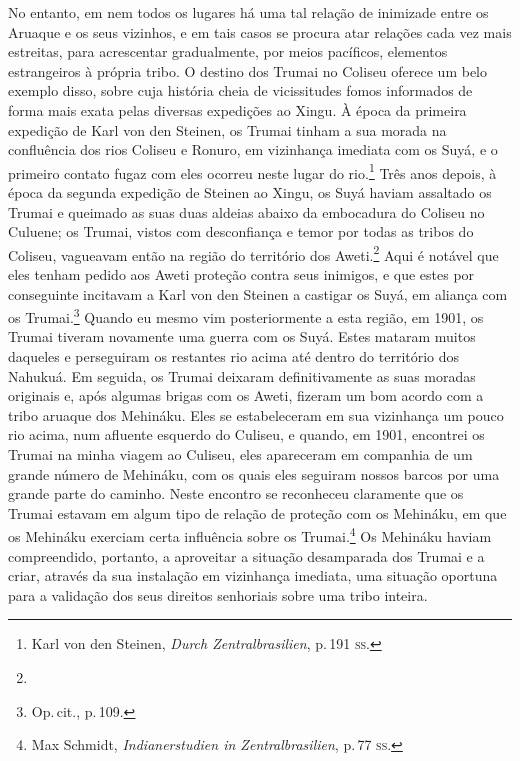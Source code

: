 No entanto, em nem todos os lugares há uma tal relação de inimizade
entre os Aruaque e os seus vizinhos, e em tais casos se procura atar
relações cada vez mais estreitas, para acrescentar gradualmente, por
meios pacíficos, elementos estrangeiros à própria tribo. O destino dos
Trumai no Coliseu oferece um belo exemplo disso, sobre cuja história
cheia de vicissitudes fomos informados de forma mais exata pelas
diversas expedições ao Xingu. À época da primeira expedição de Karl von
den Steinen, os Trumai tinham a sua morada na confluência dos rios
Coliseu e Ronuro, em vizinhança imediata com os Suyá, e o primeiro
contato fugaz com eles ocorreu neste lugar do rio.\footnote{Karl von den
  Steinen, \textit{Durch Zentralbrasilien}, p.\,191 \textsc{ss}.} Três anos depois,
à época da segunda expedição de Steinen ao Xingu, os Suyá haviam
assaltado os Trumai e queimado as suas duas aldeias abaixo da embocadura
do Coliseu no Culuene; os Trumai, vistos com desconfiança e temor por
todas as tribos do Coliseu, vagueavam então na região do território dos
Aweti.\footnote{} Aqui é notável que
eles tenham pedido aos Aweti proteção contra seus inimigos, e que estes
por conseguinte incitavam a Karl von den Steinen a castigar os Suyá, em
aliança com os Trumai.\footnote{Op.\,cit., p.\,109.} Quando eu mesmo vim
posteriormente a esta região, em 1901, os Trumai tiveram novamente uma
guerra com os Suyá. Estes mataram muitos daqueles e perseguiram os
restantes rio acima até dentro do território dos Nahukuá. Em seguida, os
Trumai deixaram definitivamente as suas moradas originais e, após
algumas brigas com os Aweti, fizeram um bom acordo com a tribo aruaque
dos Mehináku. Eles se estabeleceram em sua vizinhança um pouco rio
acima, num afluente esquerdo do Culiseu, e quando, em 1901, encontrei os
Trumai na minha viagem ao Culiseu, eles apareceram em companhia de um
grande número de Mehináku, com os quais eles seguiram nossos barcos por
uma grande parte do caminho. Neste encontro se reconheceu claramente
que os Trumai estavam em algum tipo de relação de proteção com os
Mehináku, em que os Mehináku exerciam certa influência sobre os
Trumai.\footnote{Max Schmidt, \textit{Indianerstudien in Zentralbrasilien},
  p.\,77 \textsc{ss}.} Os Mehináku haviam compreendido, portanto, a aproveitar a
situação desamparada dos Trumai e a criar, através da sua instalação em
vizinhança imediata, uma situação oportuna para a validação dos seus
direitos senhoriais sobre uma tribo inteira.


